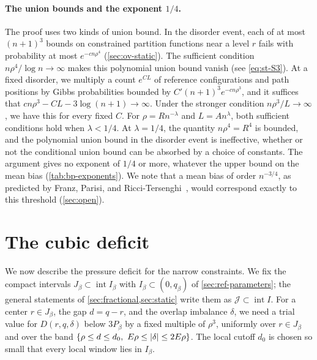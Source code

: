 \paragraph{The union bounds and the exponent $1/4$.} The proof uses two kinds
of union bound. In the disorder event, each of at most $(n+1)^3$ bounds on
constrained partition functions near a level $r$ fails with probability at
most $e^{-cn\rho^4}$ (\cref{sec:ov-static}). The sufficient condition
$n\rho^4/\log n\to\infty$ makes this polynomial union bound vanish (see
\eqref{eq:st-S3}). At a fixed disorder, we multiply a count $e^{CL}$ of reference
configurations and path positions by Gibbs probabilities bounded by
$C'(n+1)^3e^{-cn\rho^3}$, and it suffices that $cn\rho^3-CL-3\log(n+1)\to\infty$.
Under the stronger condition $n\rho^3/L\to\infty$, we have this for every fixed $C$.
For $\rho=Rn^{-\lambda}$ and $L=An^\lambda$, both sufficient conditions hold
when $\lambda<1/4$. At $\lambda=1/4$, the quantity $n\rho^4=R^4$ is bounded, and
the polynomial union bound in the disorder event is ineffective, whether or
not the conditional union bound can be absorbed by a choice of constants. The
argument gives no exponent of $1/4$ or more, whatever the upper bound on
the mean bias (\cref{tab:bp-exponents}). We note that a
mean bias of order $n^{-3/4}$, as predicted by Franz, Parisi, and
Ricci-Tersenghi~\cite{franz-parisi-ricci-2026}, would correspond exactly to this
threshold (\cref{sec:open}).

\section{The cubic deficit}\label{sec:ov-cubic}

We now describe the pressure deficit for the narrow constraints. We fix the
compact intervals $J_\beta\subset\operatorname{int}I_\beta$ with
$I_\beta\subset(0,q_\beta)$ of \cref{sec:ref-parameters}; the general
statements of \cref{sec:fractional,sec:static} write them as
$\mathcal J\subset\operatorname{int}I$. For a center $r\in J_\beta$, the gap
$d=q-r$, and the overlap imbalance $\delta$, we need a trial value for
$D(r,q,\delta)$ below $3P_\beta$ by a fixed multiple of $\rho^3$, uniformly
over $r\in J_\beta$ and over the band
$\{\rho\le d\le d_0,\ E\rho\le\abs\delta\le2E\rho\}$. The local cutoff $d_0$ is
chosen so small that every local window lies in $I_\beta$.

